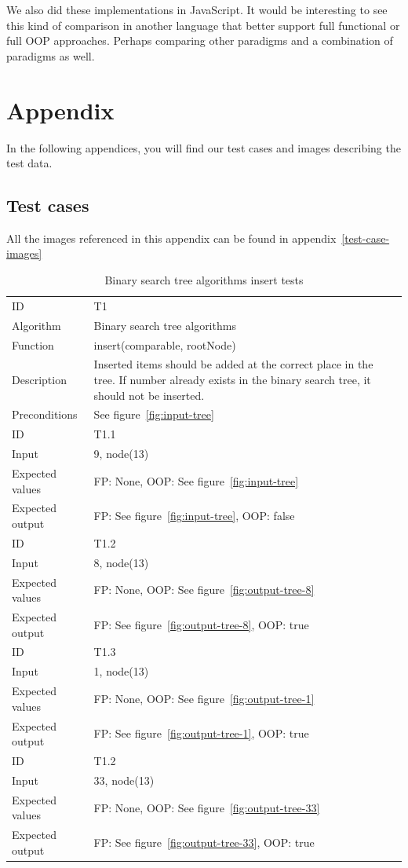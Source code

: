 \documentclass {article}
\begin{document}
We also did these implementations in JavaScript. It would be interesting to see this kind of comparison in another language that better support full functional or full OOP approaches. Perhaps comparing other paradigms and a combination of paradigms as well.



\appendix
\section{Appendix}
\label{appendix:test-cases}
In the following appendices, you will find our test cases and images describing the test data.
\subsection{Test cases}
All the images referenced in this appendix can be found in appendix~\ref{test-case-images}
\begin{table}[H]
\caption{Binary search tree algorithms insert tests}
\begin{tabular}{ | l p{10cm} | }
\hline
ID & T1 \\
Algorithm & Binary search tree algorithms \\
Function & insert(comparable, rootNode) \\
Description & Inserted items should be added at the correct place in the tree. If number already exists in the binary search tree, it should not be inserted. \\
Preconditions & See figure~\ref{fig:input-tree} \\
\hline
ID & T1.1 \\
Input & 9, node(13) \\
Expected values & FP: None, OOP: See figure~\ref{fig:input-tree} \\
Expected output & FP: See figure~\ref{fig:input-tree}, OOP: false \\
\hline
ID & T1.2 \\
Input & 8, node(13) \\
Expected values & FP: None, OOP: See figure~\ref{fig:output-tree-8} \\
Expected output & FP: See figure~\ref{fig:output-tree-8}, OOP: true \\
\hline
ID & T1.3 \\
Input & 1, node(13) \\
Expected values & FP: None, OOP: See figure~\ref{fig:output-tree-1} \\
Expected output & FP: See figure~\ref{fig:output-tree-1}, OOP: true \\
\hline
ID & T1.2 \\
Input & 33, node(13) \\
Expected values & FP: None, OOP: See figure~\ref{fig:output-tree-33} \\
Expected output & FP: See figure~\ref{fig:output-tree-33}, OOP: true \\
\hline
\end{tabular}
\label{tab:insert-tests}
\end{table}
\end{document}

